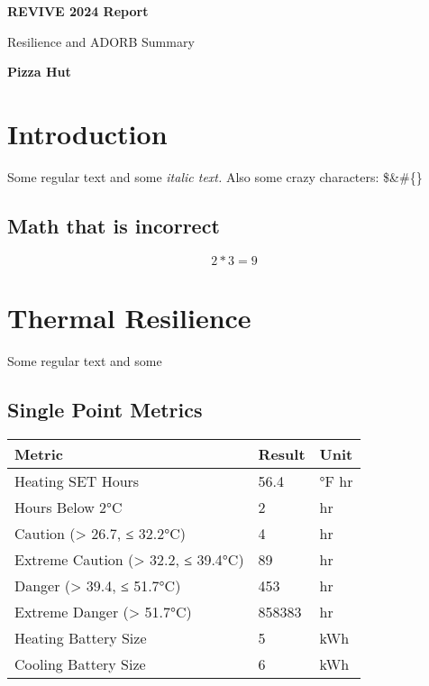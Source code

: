 \documentclass{article}%
\begin{document}
%
\normalsize%
\pagestyle{header}%
\begin{minipage}{\textwidth}%
\centering%
\begin{Large}%
\textbf{REVIVE 2024 Report}%
\end{Large}%
\linebreak%
\begin{large}%
Resilience and ADORB Summary%
\end{large}%
\linebreak%
\linebreak%
\begin{large}%
\textbf{Pizza Hut}%
\end{large}%
\end{minipage}%
\section{Introduction}%
\label{sec:Introduction}%
Some regular text and some%
\textit{italic text. }%
\newline%
Also some crazy characters: \$\&\#\{\}

%
\subsection{Math that is incorrect}%
\label{subsec:Maththatisincorrect}%
\[%
2*3 = 9%
\]

%
\section{Thermal Resilience}%
\label{sec:ThermalResilience}%
Some regular text and some

%
\subsection{Single Point Metrics}%
\label{subsec:SinglePointMetrics}%
\begin{tabular}{l|l|l}%
\hline%
Metric&Result&Unit\\%
\hline%
Heating SET Hours&56.4&°F hr\\%
Hours Below 2°C&2&hr\\%
\hline%
Caution (> 26.7, ≤ 32.2°C)&4&hr\\%
Extreme Caution (> 32.2, ≤ 39.4°C)&89&hr\\%
Danger (> 39.4, ≤ 51.7°C)&453&hr\\%
Extreme Danger (> 51.7°C)&858383&hr\\%
\hline%
Heating Battery Size&5&kWh\\%
Cooling Battery Size&6&kWh\\%
\hline%
\end{tabular}
\end{document}
